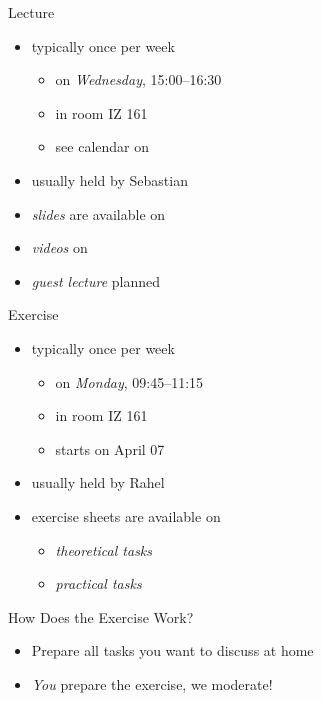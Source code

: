 \begin{frame}{\myframetitle}
	\begin{fancycolumns}
		\begin{definition}{Lecture}
			\begin{itemize}
				\item typically once per week
				\begin{itemize}
					\item on \emph{Wednesday}, 15:00--16:30
					\item in room IZ 161
					\item see calendar on \StudIP
				\end{itemize}
				\item usually held by Sebastian
				\item \emph{slides} are available on \StudIP
				\item \emph{videos} on \Youtube
				\item \emph{guest lecture} planned
			\end{itemize}
		\end{definition}
	\nextcolumn
		\begin{example}{Exercise}
			\begin{itemize}
				\item typically once per week
				\begin{itemize}
					\item on \emph{Monday}, 09:45--11:15
					\item in room IZ 161
					\item starts on April 07
				\end{itemize}
				\item usually held by Rahel
				\item exercise sheets are available on \StudIP
				\begin{itemize}
					\item \emph{theoretical tasks}
					\item \emph{practical tasks}
				\end{itemize}
			\end{itemize}
		\end{example}
		\begin{note}{How Does the Exercise Work?}
			\begin{itemize}
				\item Prepare all tasks you want to discuss at home
				\item \emph{You} prepare the exercise, we moderate!
			\end{itemize}
		\end{note}
	\end{fancycolumns}
\end{frame}

